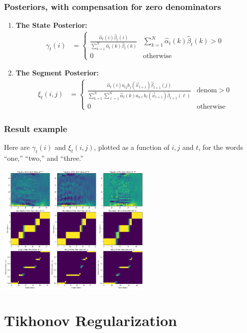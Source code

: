 \documentclass{beamer}
\begin{document}
\begin{frame}
  \frametitle{Posteriors, with compensation for zero denominators}

  \begin{enumerate}
  \item {\bf The State Posterior:}
    \begin{align*}
      \gamma_t(i) & 
      = \begin{cases}
        \frac{\hat\alpha_t(i)\hat\beta_t(i)}{\sum_{k=1}^N\hat\alpha_t(k)\hat\beta_t(k)}
        & \sum_{k=1}^N\hat\alpha_t(k)\hat\beta_t(k)>0\\
        0 & \mbox{otherwise}
      \end{cases}
    \end{align*}
  \item {\bf The Segment Posterior:}
    \begin{align*}
      \xi_t(i,j) & = 
      \begin{cases}
        \frac{\hat\alpha_t(i)a_{ij}b_j(\vec{x}_{t+1})\hat\beta_{t+1}(j)}{\sum_{k=1}^N\sum_{\ell=1}^N\hat\alpha_t(k)a_{k\ell}b_\ell(\vec{x}_{t+1})\hat\beta_{t+1}(\ell)}
        & \mbox{denom}>0\\
        0 & \mbox{otherwise}
      \end{cases}
    \end{align*}
  \end{enumerate}
\end{frame}

\begin{frame}
  \frametitle{Result example}

  Here are $\gamma_t(i)$ and $\xi_t(i,j)$, plotted as a function of
  $i,j$ and $t$, for the words ``one,'' ``two,'' and ``three.''
  \centerline{\includegraphics[height=2.5in]{gamma.png}}
\end{frame}


\section[Regularization]{Tikhonov Regularization}
\setcounter{subsection}{1}
\end{document}
